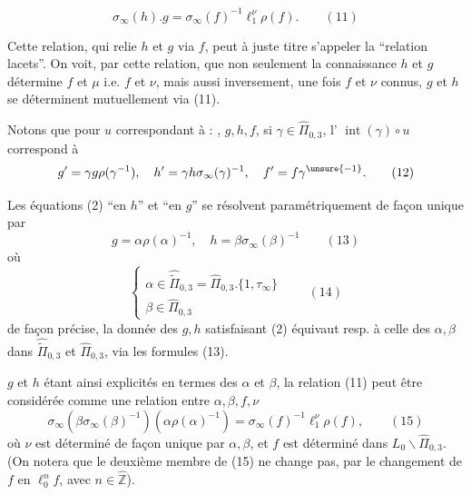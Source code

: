 

\[
\boxed{\sigma_\infty(h).g=\sigma_\infty(f)^{-1}\ell_1^\nu\rho(f)}.
\qquad (11)
\]

Cette relation, qui relie $h$ et $g$ via $f$, peut à juste titre s'appeler la ``relation lacets''.
On voit, par cette relation, que  non seulement la connaissance   $h$ et $g$ détermine $f$ et $\mu$ i.e. $f$ et $\nu$, mais aussi inversement, une fois $f$ et $\nu$ connus, $g$ et $h$ se déterminent mutuellement via (11).


Notons que pour $u$ correspondant à : , $g,h,f$, si $\gamma\in\widehat{\Pi}_{0,3}$, l'  $\operatorname{int}(\gamma)\circ u$ correspond à
\[
g'=\gamma g\rho(\gamma^{-1}),\quad
h'=\gamma h\sigma_\infty(\gamma)^{-1},\quad
f'=f\gamma^{\unsure{-1}}.
\qquad (12)
\]


Les équations (2) ``en $h$'' et ``en $g$'' se résolvent paramétriquement de façon unique par
\[
g=\alpha\rho(\alpha)^{-1},\quad
h=\beta\sigma_\infty(\beta)^{-1}
\qquad (13)
\]
où
\[
\left\{\begin{array}{l}
\alpha\in\widehat{\widetilde{\Pi}}_{0,3}=\widehat{\Pi}_{0,3}.\{1,\tau_\infty\}\\
\beta\in\widehat{\Pi}_{0,3}
\end{array}\right.
\qquad (14)
\]
de façon précise, la donnée des $g,h$ satisfaisant (2) équivaut resp. à celle des $\alpha,\beta$ dans $\widehat{\widetilde{\Pi}}_{0,3}$ et $\widehat{\Pi}_{0,3}$, via les formules (13).



 $g$ et $h$ étant ainsi explicités en termes des $\alpha$ et $\beta$, la relation  (11) peut être considérée comme une relation entre $\alpha,\beta,f,\nu$
\[
\sigma_\infty(\beta\sigma_\infty(\beta)^{-1})(\alpha\rho(\alpha)^{-1})
=\sigma_\infty(f)^{-1}\ell_1^\nu\rho(f),
\qquad (15)
\]
où  $\nu$ est déterminé de façon unique par $\alpha,\beta$, et $f$ est déterminé dans $L_0\backslash\widehat{\Pi}_{0,3}$.
(On notera que le deuxième membre de (15) ne change pas, par le changement de $f$ en $\ell_0^n f$, avec $n\in\widehat{\mathbb Z}$).

